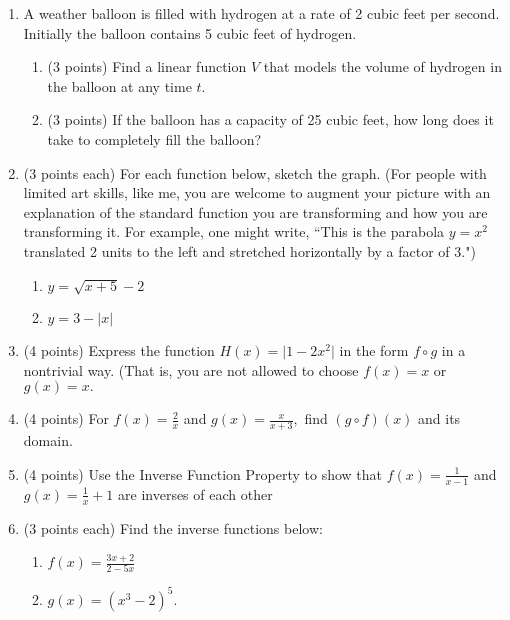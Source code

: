 \documentclass[11pt]{article}
\begin{document}
\begin{enumerate}
\item A weather balloon is filled with hydrogen at a rate of 2 cubic feet per second. Initially the balloon contains 5 cubic feet of hydrogen.
\begin{enumerate}
\item (3 points) Find a linear function $V$ that models the volume of hydrogen in the balloon at any time $t.$
\vspace{1in}
\item (3 points) If the balloon has a capacity of 25 cubic feet, how long does it take to completely fill the balloon?
\vspace{1in}
\end{enumerate}
\item (3 points each) For each function below, sketch the graph. (For people with limited art skills, like me, you are welcome to augment your picture with an explanation of the standard function you are transforming and how you are transforming it. For example, one might write, ``This is the parabola $y=x^2$ translated 2 units to the left and stretched horizontally by a factor of 3.")
\begin{enumerate}
\item $y=\sqrt{x+5}-2$
\vfill
\item $y=3-|x|$
\vfill
\end{enumerate}
\item (4 points) Express the function $H(x)=\vert 1-2x^2 \vert$ in the form $f \circ g$ in a nontrivial way. (That is, you are not allowed to choose $f(x)=x$ or $g(x)=x.$
\vspace{.75in}
\newpage
\item (4 points) For $f(x)=\frac{2}{x}$ and $g(x)=\frac{x}{x+3},$ find $(g \circ f)(x)$ and its domain.
\vfill
\item (4 points) Use the Inverse Function Property to show that $f(x)=\frac{1}{x-1}$ and $g(x)=\frac{1}{x}+1$ are inverses of each other
\vfill
\item (3 points each) Find the inverse functions below: 
\begin{enumerate}
\item $f(x)=\frac{3x+2}{2-5x}$
\vfill
\item $g(x)=(x^3-2)^5.$
\vfill
\end{enumerate}
\end{enumerate}
\end{document}

